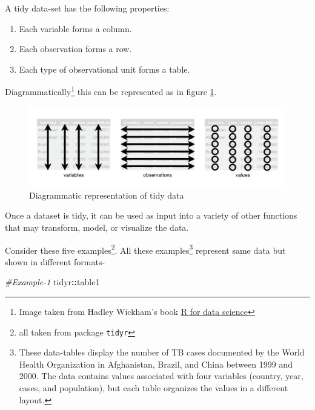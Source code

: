 \documentclass[
]{book}
\newenvironment{Shaded}{\begin{snugshade}}{\end{snugshade}}
\newcommand{\CommentTok}[1]{\textcolor[rgb]{0.56,0.35,0.01}{\textit{#1}}}
\newcommand{\NormalTok}[1]{#1}
\newcommand{\SpecialCharTok}[1]{\textcolor[rgb]{0.81,0.36,0.00}{\textbf{#1}}}
\providecommand{\tightlist}{%
  \setlength{\itemsep}{0pt}\setlength{\parskip}{0pt}}
\begin{document}
A tidy data-set has the following properties:

\begin{enumerate}
\def\labelenumi{\arabic{enumi}.}
\tightlist
\item
  Each variable forms a column.
\item
  Each observation forms a row.
\item
  Each type of observational unit forms a table.
\end{enumerate}

Diagrammatically\footnote{Image taken from Hadley Wickham's book \href{https://r4ds.had.co.nz/}{R for data science}} this can be represented as in figure \ref{fig:tidy}.

\begin{figure}

{\centering \includegraphics[width=0.99\linewidth]{images/tidy-1} 

}

\caption{Diagrammatic representation of tidy data}\label{fig:tidy}
\end{figure}

Once a dataset is tidy, it can be used as input into a variety of other functions that may transform, model, or visualize the data.

Consider these five examples\footnote{all taken from package \texttt{tidyr}}. All these examples\footnote{These data-tables display the number of TB cases documented by the World Health Organization in Afghanistan, Brazil, and China between 1999 and 2000. The data contains values associated with four variables (country, year, cases, and population), but each table organizes the values in a different layout.} represent same data but shown in different formats-

\begin{Shaded}
\begin{Highlighting}[]
\CommentTok{\#Example{-}1}
\NormalTok{tidyr}\SpecialCharTok{::}\NormalTok{table1}
\end{Highlighting}
\end{Shaded}
\end{document}
